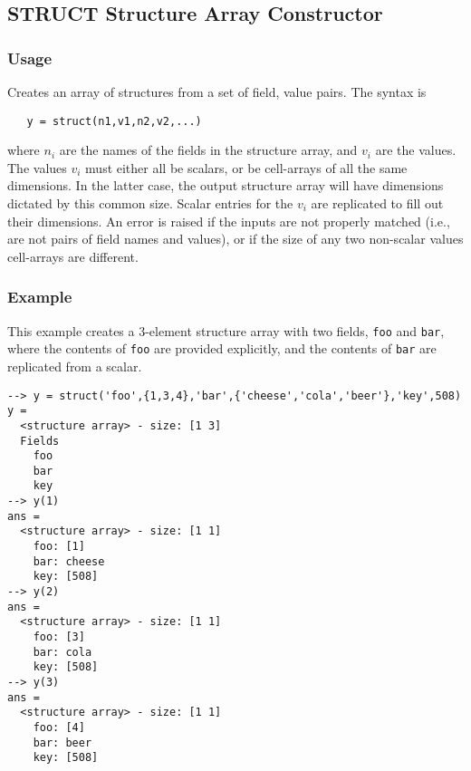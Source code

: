 %
%
%
\subsection{STRUCT Structure Array Constructor}
\subsubsection{Usage}
Creates an array of structures from a set of field, value pairs.
The syntax is
\begin{verbatim}
   y = struct(n1,v1,n2,v2,...)
\end{verbatim}
where $n_i$ are the names of the fields in the structure array, and
$v_i$ are the values.  The values $v_i$ must either all be
scalars, or be cell-arrays of all the same dimensions.  In the latter case, the
output structure array will have dimensions dictated by this common
size.  Scalar entries for the $v_i$ are replicated to fill out
their dimensions. An error is raised if the inputs are not properly matched (i.e., are
not pairs of field names and values), or if the size of any two non-scalar
values cell-arrays are different.

\subsubsection{Example}
This example creates a 3-element structure array with two fields, \verb|foo|
and \verb|bar|, where the contents of \verb|foo| are provided explicitly, and
the contents of \verb|bar| are replicated from a scalar.
\begin{verbatim}
--> y = struct('foo',{1,3,4},'bar',{'cheese','cola','beer'},'key',508)
y =
  <structure array> - size: [1 3]
  Fields
    foo
    bar
    key
--> y(1)
ans =
  <structure array> - size: [1 1]
    foo: [1]
    bar: cheese
    key: [508]
--> y(2)
ans =
  <structure array> - size: [1 1]
    foo: [3]
    bar: cola
    key: [508]
--> y(3)
ans =
  <structure array> - size: [1 1]
    foo: [4]
    bar: beer
    key: [508]
\end{verbatim}
